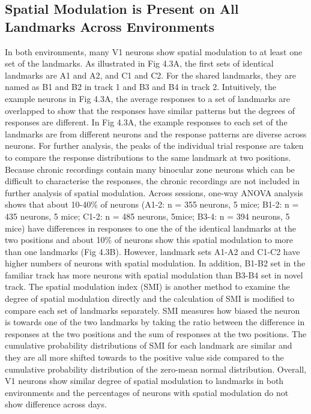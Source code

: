 \subsection{Spatial Modulation is Present on All Landmarks Across Environments}
In both environments, many V1 neurons show spatial modulation to at least one set of the landmarks. As illustrated in Fig 4.3A, the first sets of identical landmarks are A1 and A2, and C1 and C2. For the shared landmarks, they are named as B1 and B2 in track 1 and B3 and B4 in track 2. Intuitively, the example neurons in Fig 4.3A, the average responses to a set of landmarks are overlapped to show that the responses have similar patterns but the degrees of responses are different. In Fig 4.3A, the example responses to each set of the landmarks are from different neurons and the response patterns are diverse across neurons. For further analysis, the peaks of the individual trial response are taken to compare the response distributions to the same landmark at two positions. Because chronic recordings contain many binocular zone neurons which can be difficult to characterise the responses, the chronic recordings are not included in further analysis of spatial modulation. Across sessions, one-way ANOVA analysis shows that about 10-40\% of neurons (A1-2: n = 355 neurons, 5 mice; B1-2: n = 435 neurons, 5 mice; C1-2: n = 485 neurons, 5mice; B3-4: n = 394 neurons, 5 mice) have differences in responses to one the of the identical landmarks at the two positions and about 10\% of neurons show this spatial modulation to more than one landmarks (Fig 4.3B). However, landmark sets A1-A2 and C1-C2 have higher numbers of neurons with spatial modulation. In addition, B1-B2 set in the familiar track has more neurons with spatial modulation than B3-B4 set in novel track. The spatial modulation index (SMI) is another method to examine the degree of spatial modulation directly and the calculation of SMI is modified to compare each set of landmarks separately. SMI measures how biased the neuron is towards one of the two landmarks by taking the ratio between the difference in responses at the two positions and the sum of responses at the two positions. The cumulative probability distributions of SMI for each landmark are similar and they are all more shifted towards to the positive value side compared to the cumulative probability distribution of the zero-mean normal distribution. Overall, V1 neurons show similar degree of spatial modulation to landmarks in both environments and the percentages of neurons with spatial modulation do not show difference across days. 

